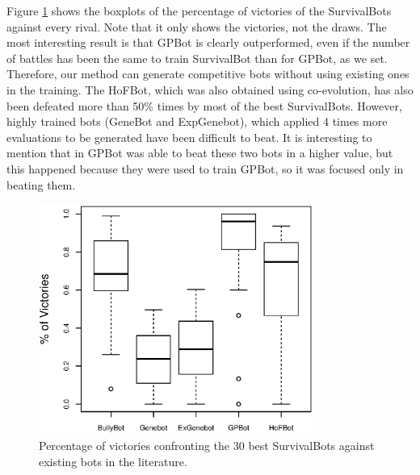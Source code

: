 \documentclass[conference]{IEEEtran}
\begin{document}
Figure \ref{figure:boxplot_mejores_contra_clasicos} shows the boxplots of the percentage of victories of the SurvivalBots against every rival. Note that it only shows the victories, not the draws. The most interesting result is that GPBot is clearly outperformed, even if the number of battles has been the same to train SurvivalBot than for GPBot, as we set. Therefore, our method can generate competitive bots without using existing ones in the training. The HoFBot, which was also obtained using co-evolution, has also been defeated more than 50\% times by most of the best SurvivalBots. However, highly trained bots (GeneBot and ExpGenebot), which applied 4 times more evaluations to be generated have been difficult to beat. It is interesting to mention that in \cite{GarciaGP14} GPBot was able to beat these two bots in a higher value, but this happened because they were used to train GPBot, so it was focused only in beating them.

\begin{figure}[htb]
\tiny
\begin{center}
    \includegraphics[width=9cm]{./imags/boxplot_mejores_contra_clasicos.eps}

\end{center}
\caption{Percentage of victories confronting the 30 best SurvivalBots against existing bots in the literature.}
\label{figure:boxplot_mejores_contra_clasicos}
\end{figure}
\end{document}
